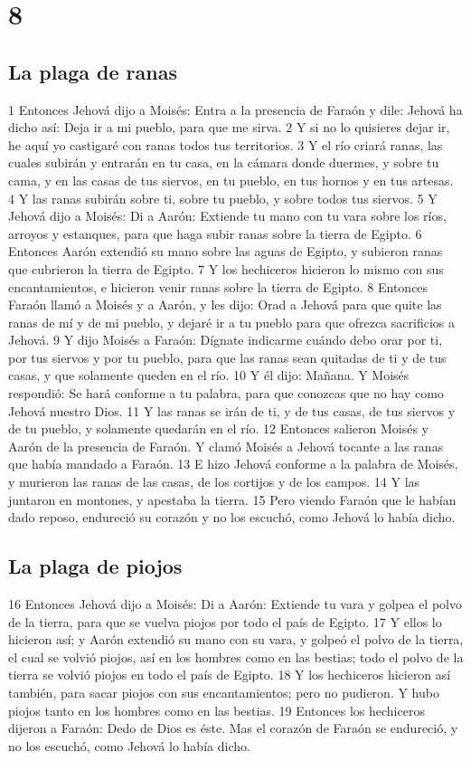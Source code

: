 \chapter{8}

\section*{La plaga de ranas}
1 Entonces Jehová dijo a Moisés: Entra a la presencia de Faraón y dile: Jehová ha dicho así: Deja ir a mi pueblo, para que me sirva.
2 Y si no lo quisieres dejar ir, he aquí yo castigaré con ranas todos tus territorios.
3 Y el río criará ranas, las cuales subirán y entrarán en tu casa, en la cámara donde duermes, y sobre tu cama, y en las casas de tus siervos, en tu pueblo, en tus hornos y en tus artesas.
4 Y las ranas subirán sobre ti, sobre tu pueblo, y sobre todos tus siervos.
5 Y Jehová dijo a Moisés: Di a Aarón: Extiende tu mano con tu vara sobre los ríos, arroyos y estanques, para que haga subir ranas sobre la tierra de Egipto.
6 Entonces Aarón extendió su mano sobre las aguas de Egipto, y subieron ranas que cubrieron la tierra de Egipto.
7 Y los hechiceros hicieron lo mismo con sus encantamientos, e hicieron venir ranas sobre la tierra de Egipto.
8 Entonces Faraón llamó a Moisés y a Aarón, y les dijo: Orad a Jehová para que quite las ranas de mí y de mi pueblo, y dejaré ir a tu pueblo para que ofrezca sacrificios a Jehová.
9 Y dijo Moisés a Faraón: Dígnate indicarme cuándo debo orar por ti, por tus siervos y por tu pueblo, para que las ranas sean quitadas de ti y de tus casas, y que solamente queden en el río.
10 Y él dijo: Mañana. Y Moisés respondió: Se hará conforme a tu palabra, para que conozcas que no hay como Jehová nuestro Dios.
11 Y las ranas se irán de ti, y de tus casas, de tus siervos y de tu pueblo, y solamente quedarán en el río.
12 Entonces salieron Moisés y Aarón de la presencia de Faraón. Y clamó Moisés a Jehová tocante a las ranas que había mandado a Faraón.
13 E hizo Jehová conforme a la palabra de Moisés, y murieron las ranas de las casas, de los cortijos y de los campos.
14 Y las juntaron en montones, y apestaba la tierra.
15 Pero viendo Faraón que le habían dado reposo, endureció su corazón y no los escuchó, como Jehová lo había dicho.

\section*{La plaga de piojos}
16 Entonces Jehová dijo a Moisés: Di a Aarón: Extiende tu vara y golpea el polvo de la tierra, para que se vuelva piojos por todo el país de Egipto.
17 Y ellos lo hicieron así; y Aarón extendió su mano con su vara, y golpeó el polvo de la tierra, el cual se volvió piojos, así en los hombres como en las bestias; todo el polvo de la tierra se volvió piojos en todo el país de Egipto.
18 Y los hechiceros hicieron así también, para sacar piojos con sus encantamientos; pero no pudieron. Y hubo piojos tanto en los hombres como en las bestias.
19 Entonces los hechiceros dijeron a Faraón: Dedo de Dios es éste. Mas el corazón de Faraón se endureció, y no los escuchó, como Jehová lo había dicho.

